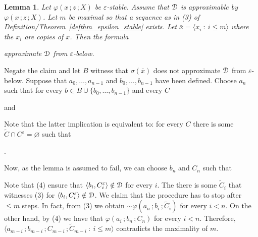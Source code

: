 \documentclass{amsproc}
\makeatletter
\newcounter{thm}
\theoremstyle{mio}
\newtheorem{lemma}[thm]{Lemma}\tcolorboxenvironment{lemma}{mythm}
\providecommand{\proofNameStyle}{\bfseries}
\renewenvironment{proof}[1][\proofname]{\par
  \pushQED{\qed}%
  \normalfont%
  \trivlist
  \item[\hskip\labelsep
        \proofNameStyle
    #1\@addpunct{.}]\ignorespaces
}{%
  \popQED\endtrivlist\@endpefalse
}
\makeatother
\begin{document}
\begin{lemma}
  Let $\varphi(x\,;z\,;X)$ be $\varepsilon$-stable.
  Assume that ${\EuScript D}$ is approximable by $\varphi(x\,;z\,;X)$.
  Let $m$ be maximal so that a sequence as in (3) of Definition/Theorem~\ref{defthm_epsilon_stable} exists.
  Let $\bar x=\langle x_i\ :\ i\le m\rangle$ where the $x_i$ are copies of $x$.
  Then the formula\smallskip

  \smallskip

  approximate ${\EuScript D}$ from $\varepsilon$-below.
\end{lemma}

\begin{proof}
  Negate the claim and let $B$ witness that $\sigma(\bar x)$ does not approximate ${\EuScript D}$ from $\varepsilon$-below.
  Suppose that $a_0,\dots,a_{n-1}$ and $b_0,\dots,b_{n-1}$ have been defined.
  Choose $a_n$ such that for every $b\in B\cup\{b_0,\dots,b_{n-1}\}$ and every $C$

  \quad and

  
  Note that the latter implication is equivalent to: for every $C$ there is some  $\tilde C\cap C^\varepsilon=\varnothing$ such that 
  
  .%

  Now, as the lemma is assumed to fail, we can choose $b_n$ and $C_n$ such that


  Note that (4) ensure that $\langle b_i,C_i^\varepsilon\rangle\notin{\EuScript D}$ for every $i$.
  The there is some $\tilde C_i$ that witnesses (3) for $\langle b_i,C_i^\varepsilon\rangle\notin{\EuScript D}$.
  We claim that the procedure has to stop after $\le m$ steps. 
  In fact, from (3) we obtain ${\sim}\varphi(a_n\,;b_i\,;\tilde C_i)$ for every $i<n$.
  On the other hand, by (4) we have that $\varphi(a_i\,;b_n\,;C_n)$ for every $i<n$.
  Therefore, $\langle a_{m-i}\,;b_{m-i}\,;C_{m-i}\,;\tilde C_{m-i}\ :\ i\le m\rangle$ contradicts the maximality of $m$.
\end{proof}
\end{document}
